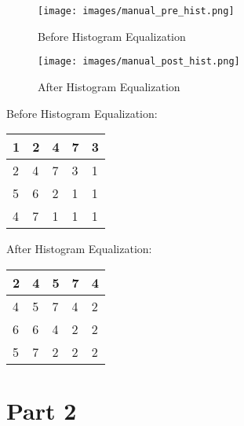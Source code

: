 \documentclass[conference]{IEEEtran}
\begin{document}
\begin{figure}[htbp]
    \centering
    \texttt{[image: images/manual\_pre\_hist.png]}
    \caption{Before Histogram Equalization}
    \centering
    \texttt{[image: images/manual\_post\_hist.png]}
    \caption{After Histogram Equalization}
\end{figure}

Before Histogram Equalization:

\begin{center}
\begin{tabular}{ |l|l|l|l|l| } 
\hline
1 & 2 & 4 & 7 & 3\\ \hline
2 & 4 & 7 & 3 & 1\\ \hline
5 & 6 & 2 & 1 & 1\\ \hline
4 & 7 & 1 & 1 & 1\\ \hline
\end{tabular}
\end{center}

After Histogram Equalization:

\begin{center}
\begin{tabular}{ |l|l|l|l|l| } 
\hline
2 & 4 & 5 & 7 & 4\\ \hline
4 & 5 & 7 & 4 & 2\\ \hline
6 & 6 & 4 & 2 & 2 \\ \hline
5 & 7 & 2 & 2 & 2\\ \hline
\end{tabular}
\end{center}

\section*{Part 2}
\end{document}

